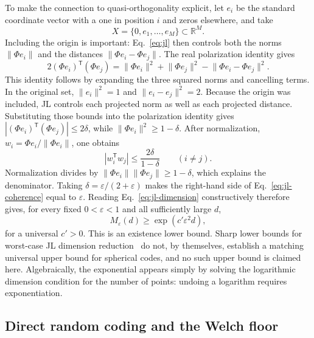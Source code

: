 \documentclass[
  aps,
  reprint,
  superscriptaddress,
  floatfix,
  nofootinbib,
  longbibliography
]{revtex4-2}
\newcommand{\R}{\mathbb{R}}
\newcommand{\Msem}{M}
\newcommand{\T}{^{\mathsf{T}}}
\newcommand{\norm}[1]{\lVert #1 \rVert}
\begin{document}
To make the connection to quasi-orthogonality explicit, let $e_i$ be the
standard coordinate vector with a one in position $i$ and zeros elsewhere,
and take
\[
X=\{0,e_1,\ldots,e_{\Msem}\}\subset\R^{\Msem}.
\]
Including the origin is important: Eq.~\eqref{eq:jl} then controls both the
norms $\norm{\Phi e_i}$ and the distances
$\norm{\Phi e_i-\Phi e_j}$.  The real
polarization identity gives
\begin{equation}
\label{eq:polarization}
2(\Phi e_i)\T(\Phi e_j)
=\norm{\Phi e_i}^2+\norm{\Phi e_j}^2
-\norm{\Phi e_i-\Phi e_j}^2.
\end{equation}
This identity follows by expanding the three squared norms and cancelling
terms.  In the original set, $\norm{e_i}^2=1$ and
$\norm{e_i-e_j}^2=2$.  Because the origin was included, JL controls each
projected norm as well as each projected distance.  Substituting those bounds
into the polarization identity gives
$|(\Phi e_i)\T(\Phi e_j)|\leq2\delta$, while
$\norm{\Phi e_i}^2\geq1-\delta$.  After normalization,
$w_i=\Phi e_i/\norm{\Phi e_i}$, one obtains
\begin{equation}
\label{eq:jl-coherence}
|w_i\T w_j|
\leq\frac{2\delta}{1-\delta}
\qquad(i\ne j).
\end{equation}
Normalization divides by
$\norm{\Phi e_i}\norm{\Phi e_j}\geq1-\delta$, which explains the denominator.
Taking $\delta=\varepsilon/(2+\varepsilon)$ makes the right-hand side of
Eq.~\eqref{eq:jl-coherence} equal to $\varepsilon$.  Reading
Eq.~\eqref{eq:jl-dimension} constructively therefore gives, for every fixed
$0<\varepsilon<1$ and all sufficiently large $d$,
\begin{equation}
\label{eq:jl-inverse}
M_\varepsilon(d)
\geq
\exp(c'\varepsilon^2d),
\end{equation}
for a universal $c'>0$.  This is an existence lower bound.  Sharp lower bounds for worst-case JL
dimension reduction~\cite{alon2016optimal,larsen-nelson-2017} do not, by
themselves, establish a matching universal upper bound for spherical codes,
and no such upper bound is claimed here.  Algebraically, the exponential
appears simply by solving the logarithmic dimension condition for the number
of points: undoing a logarithm requires exponentiation.

\subsection{Direct random coding and the Welch floor}
\label{sec:quasiortho}
\end{document}
